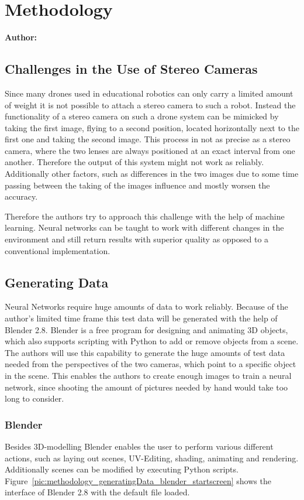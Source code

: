 \chapter{Methodology}

\textbf{Author: } 

\section{Challenges in the Use of Stereo Cameras}
Since many drones used in educational robotics can only carry a limited amount of weight it is not possible to attach a stereo camera to such a robot. Instead the functionality of a stereo camera on such a drone system can be mimicked by taking the first image, flying to a second position, located horizontally next to the first one and taking the second image. This process in not as precise as a stereo camera, where the two lenses are always positioned at an exact interval from one another. Therefore the output of this system might not work as reliably. Additionally other factors, such as differences in the two images due to some time passing between the taking of the images influence and mostly worsen the accuracy.

Therefore the authors try to approach this challenge with the help of machine learning. Neural networks can be taught to work with different changes in the environment and still return results with superior quality as opposed to a conventional implementation.

\section{Generating Data}
Neural Networks require huge amounts of data to work reliably. Because of the author's limited time frame this test data will be generated with the help of Blender 2.8. Blender is a free program for designing and animating 3D objects, which also supports scripting with Python to add or remove objects from a scene. The authors will use this capability to generate the huge amounts of test data needed from the perspectives of the two cameras, which point to a specific object in the scene. This enables the authors to create enough images to train a neural network, since shooting the amount of pictures needed by hand would take too long to consider. 

\newpage

\subsection{Blender}
Besides 3D-modelling Blender enables the user to perform various different actions, such as laying out scenes, UV-Editing, shading, animating and rendering. Additionally scenes can be modified by executing Python scripts. Figure~\ref{pic:methodology_generatingData_blender_startscreen} shows the interface of Blender 2.8 with the default file loaded.

